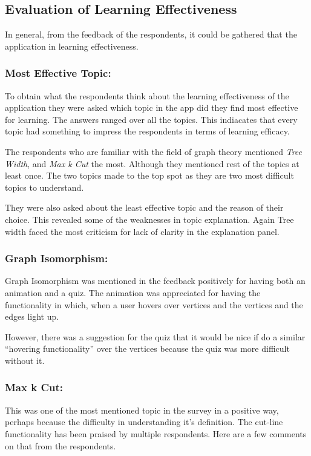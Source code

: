 \subsection{Evaluation of Learning Effectiveness}
In general, from the feedback of the respondents, it could be gathered
that the application in learning effectiveness.

\subsubsection{Most Effective Topic:}
To obtain what the respondents think about the learning effectiveness of the
application they were asked which topic in the app did they find most effective
for learning. The answers ranged over all the topics. This indiacates that every
topic had something to impress the respondents in terms of learning efficacy.


The respondents who are familiar with the field of graph theory mentioned
\emph{Tree Width}, and \emph{Max k Cut} the most. Although they mentioned rest
of the topics at least once. The two topics made to the top spot as they are
two most difficult topics to understand.

They were also asked about the least effective topic and the reason of their choice. 
This revealed some of the weaknesses in topic explanation. Again Tree width
faced the most criticism for lack of clarity in the explanation panel. 

\subsubsection{Graph Isomorphism:}
Graph Isomorphism was mentioned in the feedback positively for having both an
animation and a quiz. The animation was appreciated for having the
functionality in which, when a user hovers over vertices and the vertices and
the edges light up. 

However, there was a suggestion for the quiz 
that it would be nice if do a similar ``hovering functionality'' over the
vertices because the quiz was more difficult without it.

\subsubsection{Max k Cut:}
This was one of the most mentioned topic in the survey in a positive way,
perhaps because the difficulty in understanding it's definition. The cut-line
functionality has been praised by multiple respondents. Here are a few
comments on that from the respondents.

